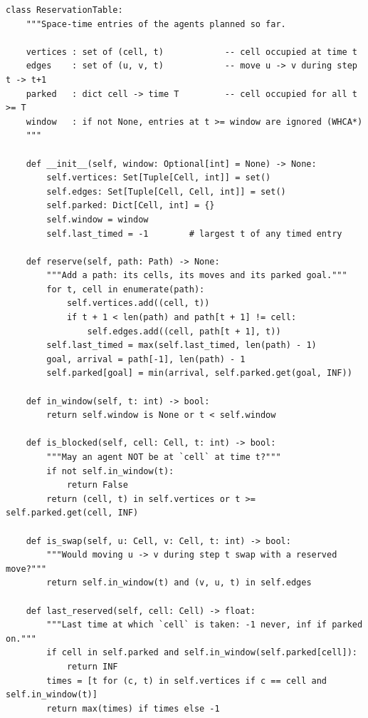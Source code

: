 \begin{lstlisting}[caption={The reservation table (from \code{code/ch08\_prioritized.py}): vertex entries, move entries and parked goals, with the three blocking tests of \cref{alg:ch08-ca}.},label={lst:ch08-table}]
class ReservationTable:
    """Space-time entries of the agents planned so far.

    vertices : set of (cell, t)            -- cell occupied at time t
    edges    : set of (u, v, t)            -- move u -> v during step t -> t+1
    parked   : dict cell -> time T         -- cell occupied for all t >= T
    window   : if not None, entries at t >= window are ignored (WHCA*)
    """

    def __init__(self, window: Optional[int] = None) -> None:
        self.vertices: Set[Tuple[Cell, int]] = set()
        self.edges: Set[Tuple[Cell, Cell, int]] = set()
        self.parked: Dict[Cell, int] = {}
        self.window = window
        self.last_timed = -1        # largest t of any timed entry

    def reserve(self, path: Path) -> None:
        """Add a path: its cells, its moves and its parked goal."""
        for t, cell in enumerate(path):
            self.vertices.add((cell, t))
            if t + 1 < len(path) and path[t + 1] != cell:
                self.edges.add((cell, path[t + 1], t))
        self.last_timed = max(self.last_timed, len(path) - 1)
        goal, arrival = path[-1], len(path) - 1
        self.parked[goal] = min(arrival, self.parked.get(goal, INF))

    def in_window(self, t: int) -> bool:
        return self.window is None or t < self.window

    def is_blocked(self, cell: Cell, t: int) -> bool:
        """May an agent NOT be at `cell` at time t?"""
        if not self.in_window(t):
            return False
        return (cell, t) in self.vertices or t >= self.parked.get(cell, INF)

    def is_swap(self, u: Cell, v: Cell, t: int) -> bool:
        """Would moving u -> v during step t swap with a reserved move?"""
        return self.in_window(t) and (v, u, t) in self.edges

    def last_reserved(self, cell: Cell) -> float:
        """Last time at which `cell` is taken: -1 never, inf if parked on."""
        if cell in self.parked and self.in_window(self.parked[cell]):
            return INF
        times = [t for (c, t) in self.vertices if c == cell and self.in_window(t)]
        return max(times) if times else -1
\end{lstlisting}

